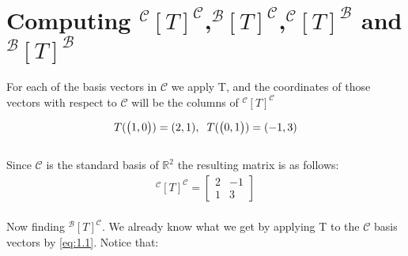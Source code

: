 \documentclass[reqno,a4paper,12pt]{amsart}
\author{Lewis McConkey}
\date{\today}
{\title{ \LARGE{Math220/Math240 \\
          \hspace{16cm}Individual Coursework}}}
\newcommand{\R}{\mathbb{R}}
\newcommand{\C}{\mathscr{C}}
\newcommand{\B}{\mathscr{B}}
\numberwithin{equation}{section}
\begin{document}
\maketitle
\section{Computing $^\C[T]^\C$,$^\B[T]^\C$,$^\C[T]^\B$ and $^\B[T]^\B$}

For each of the basis vectors in $\C$ we apply T, and the coordinates of those vectors with respect to $\C$ will be the columns of $^\C[T]^\C$

  \begin{align}
  T(
    \begin{pmatrix}
      1 , 0 \\
    \end{pmatrix}
    )
    =
    (2,1),\hspace{0.2cm}
    T(
    \begin{pmatrix}
    0 , 1 \\
    \end{pmatrix}
    )
    =
    (-1,3) \label{eq:1.1}
  \end{align}\\
Since $\C$ is the standard basis of $\R^2$ the resulting matrix is as follows:
  \begin{align}
     ^\C[T]^\C 
     =
     \begin{bmatrix}
       2 & -1 \\
       1  & 3
     \end{bmatrix} \label{eq:1.2}
   \end{align}\\
Now finding $^\B[T]^\C$. We already know what we get by applying T to the $\C$ basis vectors by \eqref{eq:1.1}. Notice that:
\end{document}
